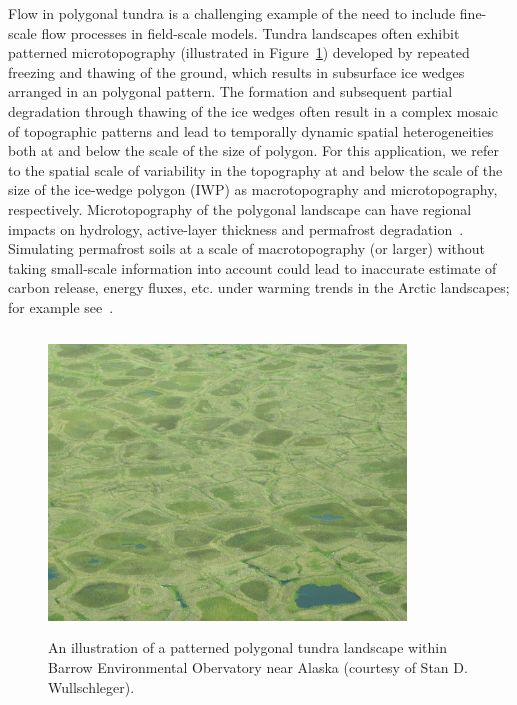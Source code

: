 \documentclass[review,11pt]{elsarticle}
\begin{document}
Flow in polygonal tundra is a challenging example of the need to include fine-scale flow processes in field-scale models.
Tundra landscapes often exhibit patterned microtopography (illustrated in Figure~\ref{tundra-sitesA-B}) developed by repeated freezing and thawing of the ground, which results in subsurface ice wedges arranged in an polygonal pattern.
The formation and subsequent partial degradation through thawing of the ice wedges often result in a complex mosaic of topographic patterns and lead to temporally dynamic spatial heterogeneities both at and below the scale of the size of polygon.
For this application, we refer to the spatial scale of variability in the topography at and below the scale of the size of the ice-wedge polygon (IWP) as macrotopography and microtopography, respectively. 
Microtopography of the polygonal landscape can have regional impacts on hydrology, active-layer thickness and permafrost degradation~\cite{jorgenson2001permafrost,liljedahl2016pan}.
Simulating permafrost soils at a scale of macrotopography (or larger) without taking small-scale information into account could lead to inaccurate estimate of carbon release, energy fluxes, etc. under warming trends in the Arctic landscapes; for example see~\cite{liljedahl2016pan,lu2012modeling,andresen2015disappearing,holden2005peatland}. 
%
\begin{figure}[!h]
\centering
\includegraphics[width=9.5cm, height=8cm]{./figures/polygonal-landscape.jpg}
\caption{An illustration of a patterned polygonal tundra landscape within Barrow Environmental Obervatory near Alaska (courtesy of Stan D. Wullschleger).}
\label{tundra-sitesA-B}
\end{figure}
%
\end{document}
